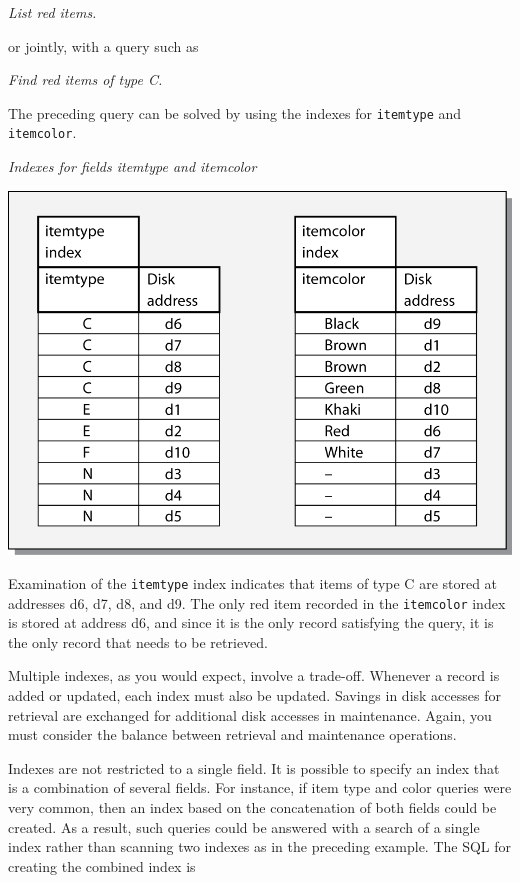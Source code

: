 \documentclass[
]{article}
\begin{document}
\emph{List red items.}

or jointly, with a query such as

\emph{Find red items of type C.}

The preceding query can be solved by using the indexes for \texttt{itemtype}
and \texttt{itemcolor}.

\emph{Indexes for fields itemtype and itemcolor}

\includegraphics{Figures/Chapter 20/multiple indexes.png}

Examination of the \texttt{itemtype} index indicates that items of type C are
stored at addresses d6, d7, d8, and d9. The only red item recorded in
the \texttt{itemcolor} index is stored at address d6, and since it is the only
record satisfying the query, it is the only record that needs to be
retrieved.

Multiple indexes, as you would expect, involve a trade-off. Whenever a
record is added or updated, each index must also be updated. Savings in
disk accesses for retrieval are exchanged for additional disk accesses
in maintenance. Again, you must consider the balance between retrieval
and maintenance operations.

Indexes are not restricted to a single field. It is possible to specify
an index that is a combination of several fields. For instance, if item
type and color queries were very common, then an index based on the
concatenation of both fields could be created. As a result, such queries
could be answered with a search of a single index rather than scanning
two indexes as in the preceding example. The SQL for creating the
combined index is
\end{document}
